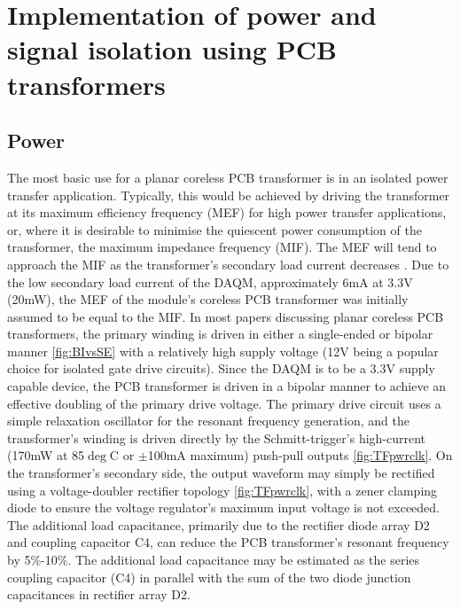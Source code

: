 \documentclass[conference]{IEEEtran}
\begin{document}
\section{Implementation of power and signal isolation using PCB transformers}

	\subsection{Power}
	The most basic use for a planar coreless PCB transformer is in an isolated power transfer application.  Typically, this would be achieved by driving the transformer at its maximum efficiency frequency (MEF) for high power transfer applications, or, where it is desirable to minimise the quiescent power consumption of the transformer, the maximum impedance frequency (MIF).  The MEF will tend to approach the MIF as the transformer's secondary load current decreases \cite{TangHuiFundamental}.  
	Due to the low secondary load current of the DAQM, approximately 6mA at 3.3V (20mW), the MEF of the module's coreless PCB transformer was initially assumed to be equal to the MIF.  In most papers discussing planar coreless PCB transformers, the primary winding is driven in either a single-ended or bipolar manner \ref{fig:BIvsSE} with a relatively high supply voltage (12V being a popular choice for isolated gate drive circuits).  Since the DAQM is to be a 3.3V supply capable device, the PCB transformer is driven in a bipolar manner to achieve an effective doubling of the primary drive voltage.  The primary drive circuit uses a simple relaxation oscillator for the resonant frequency generation, and the transformer's winding is driven directly by the Schmitt-trigger's high-current (170mW at 85$\deg$C or $\pm$100mA maximum) push-pull outputs \ref{fig:TFpwrclk}.
	On the transformer's secondary side, the output waveform may simply be rectified using a voltage-doubler rectifier topology \ref{fig:TFpwrclk}, with a zener clamping diode to ensure the voltage regulator's maximum input voltage is not exceeded.  The additional load capacitance, primarily due to the rectifier diode array D2 and coupling capacitor C4, can reduce the PCB transformer's resonant frequency by 5\%-10\%.  The additional load capacitance may be estimated as the series coupling capacitor (C4) in parallel with the sum of the two diode junction capacitances in rectifier array D2.
	
\end{document}
